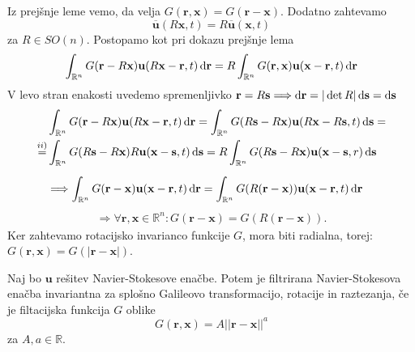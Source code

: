 \documentclass[mat2, tisk]{fmfdelo}
\newcommand{\R}{\mathbb R}
\newcommand{\bd}{\textbf}
\begin{document}
\begin{dokaz}
Iz prejšnje leme vemo, da velja $G(\bd{r}, \bd{x}) = G(\bd{r} - \bd{x})$. Dodatno zahtevamo 
$$
\overline{\bd{u}}(R\bd{x}, t) = R \overline{\bd{u}}(\bd{x}, t)
$$
za $R\in SO(n)$. Postopamo kot pri dokazu prejšnje lema 
$$\int_{\R^n} G(\bd{r} - R\bd{x}) \bd{u}(R\bd{x} - \bd{r}, t)\dif \bd{r} = R \int_{\R^n} G(\bd{r}, \bd{x}) \bd{u}(\bd{x} - \bd{r}, t)\dif \bd{r}$$
V levo stran enakosti uvedemo spremenljivko $\bd{r} = R \bd{s} \Longrightarrow \dif \bd{r} = |\det{R}| \dif \bd{s} = \dif \bd{s}$
\begin{align*}
&\int_{\R^n} G(\bd{r} - R\bd{x}) \bd{u}(R\bd{x} - \bd{r}, t)\dif \bd{r} = \int_{\R^n} G(R\bd{s} - R\bd{x}) \bd{u}(R\bd{x} - R\bd{s}, t)\dif \bd{s} = \\
\stackrel{ii)}{=} &\int_{\R^n} G(R\bd{s} - R\bd{x}) R\bd{u}(\bd{x} - \bd{s}, t)\dif \bd{s} = R\int_{\R^n} G(R\bd{s} - R\bd{x}) \bd{u}(\bd{x} - \bd{s}, r)\dif \bd{s}\\[2mm]
&\Longrightarrow \int_{\R^n} G(\bd{r} - \bd{x}) \bd{u}(\bd{x} - \bd{r}, t)\dif \bd{r} = \int_{\R^n} G(R(\bd{r} - \bd{x})) \bd{u}(\bd{x} - \bd{r}, t)\dif \bd{r}
\end{align*}
\begin{align*}
\Longrightarrow \forall \bd{r}, \bd{x}\in \R^n: G(\bd{r} - \bd{x}) = G(R(\bd{r} - \bd{x})).
\end{align*}
Ker zahtevamo rotacijsko invarianco funkcije $G$, mora biti radialna, torej:\\ $G(\bd{r}, \bd{x}) = G(|\bd{r} - \bd{x}|)$.
\end{dokaz}

\begin{lema}
Naj bo $\bd{u}$ rešitev Navier-Stokesove enačbe. Potem je filtrirana Navier-Stokesova enačba 
invariantna za splošno Galileovo transformacijo, rotacije in raztezanja, če je filtacijska funkcija $G$ oblike
$$
G(\bd{r}, \bd{x}) = A||\bd{r} - \bd{x}||^a
$$
za $A, a\in \R$.
\end{lema}
\end{document}
